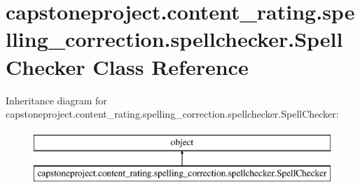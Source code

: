 \hypertarget{classcapstoneproject_1_1content__rating_1_1spelling__correction_1_1spellchecker_1_1_spell_checker}{}\section{capstoneproject.\+content\+\_\+rating.\+spelling\+\_\+correction.\+spellchecker.\+Spell\+Checker Class Reference}
\label{classcapstoneproject_1_1content__rating_1_1spelling__correction_1_1spellchecker_1_1_spell_checker}
Inheritance diagram for capstoneproject.\+content\+\_\+rating.\+spelling\+\_\+correction.\+spellchecker.\+Spell\+Checker\+:\begin{figure}[H]
\begin{center}
\leavevmode
\includegraphics[height=2.000000cm]{classcapstoneproject_1_1content__rating_1_1spelling__correction_1_1spellchecker_1_1_spell_checker}
\end{center}
\end{figure}
